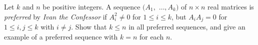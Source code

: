 \documentclass{article}
\begin{document}
\setlength{\parindent}{0pt}
Let $k$ and $n$ be positive integers. A sequence $(A_1,$ $\dots,A_k)$ of $n\times n$ real matrices is \emph{preferred} by \emph{Ivan the Confessor} if $A_i^2\ne 0$ for $1\le i\le k$, but $A_iA_j=0$ for $1\le i,j\le k$ with $i\ne j$. Show that $k\le n$ in all preferred sequences, and give an example of a preferred sequence with $k=n$ for each $n$.
\end{document}
